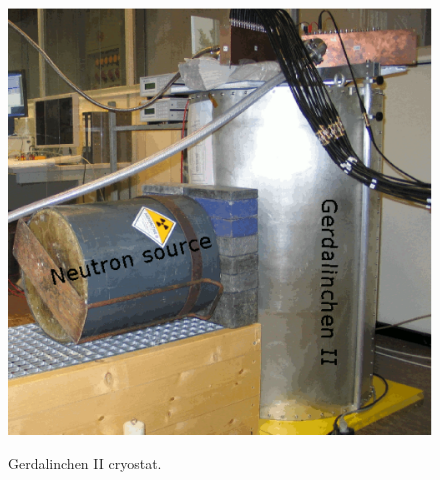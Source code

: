 \begin{figure}[tbhp]
{    \includegraphics[height=0.25\textheight]{GIIneutron}}\hfil%
  \caption{Gerdalinchen II cryostat.}
  \label{fig:tt:gii}
\end{figure}

